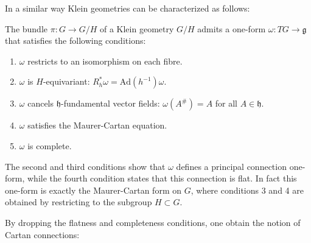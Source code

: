     In a similar way Klein geometries can be characterized as follows:
    \begin{property}
        The bundle $\pi:G\rightarrow G/H$ of a Klein geometry $G/H$ admits a one-form $\omega:TG\rightarrow\mathfrak{g}$ that satisfies the following conditions:
        \begin{enumerate}
            \item $\omega$ restricts to an isomorphism on each fibre.
            \item $\omega$ is $H$-equivariant: $R_h^*\omega = \text{Ad}(h^{-1})\omega$.
            \item $\omega$ cancels $\mathfrak{h}$-fundamental vector fields: $\omega(A^\#)=A$ for all $A\in\mathfrak{h}$.
            \item $\omega$ satisfies the Maurer-Cartan equation.
            \item $\omega$ is complete.
        \end{enumerate}
    \end{property}
    The second and third conditions show that $\omega$ defines a principal connection one-form, while the fourth condition states that this connection is flat. In fact this one-form is exactly the Maurer-Cartan form on $G$, where conditions 3 and 4 are obtained by restricting to the subgroup $H\subset G$.

    By dropping the flatness and completeness conditions, one obtain the notion of Cartan connections:

